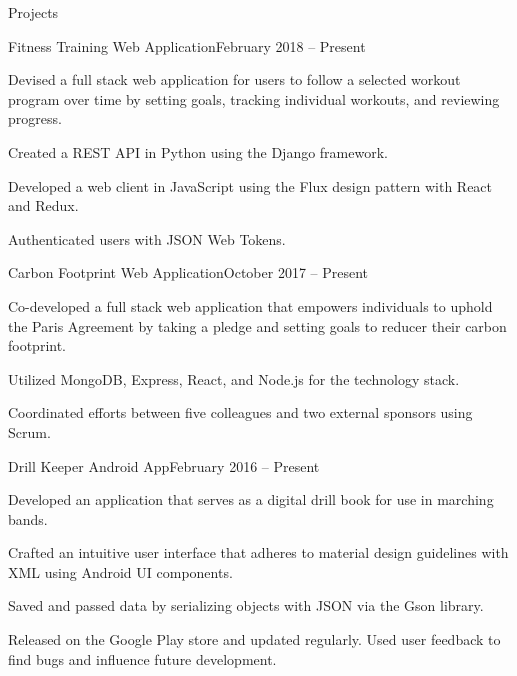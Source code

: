 \documentclass{resume} %
\begin{document}
\begin{rSection}{Projects}

\begin{rSubsection}{Fitness Training Web Application}{February 2018 -- Present}{}{}
\item Devised a full stack web application for users to follow a selected workout program over time by setting goals, tracking individual workouts, and reviewing progress.
\item Created a REST API in Python using the Django framework.
\item Developed a web client in JavaScript using the Flux design pattern with React and Redux.
\item Authenticated users with JSON Web Tokens.
\end{rSubsection}

\begin{rSubsection}{Carbon Footprint Web Application}{October 2017 -- Present}{}{}
\item Co-developed a full stack web application that empowers individuals to uphold the Paris Agreement by taking a pledge and setting goals to reducer their carbon footprint.
\item Utilized MongoDB, Express, React, and Node.js for the technology stack.
\item Coordinated efforts between five colleagues and two external sponsors using Scrum.
\end{rSubsection}

\begin{rSubsection}{Drill Keeper Android App}{February 2016 -- Present}{}{}
\item Developed an application that serves as a digital drill book for use in marching bands.
\item Crafted an intuitive user interface that adheres to material design guidelines with XML using Android UI components.
\item Saved and passed data by serializing objects with JSON via the Gson library.
\item Released on the Google Play store and updated regularly. Used user feedback to find bugs and influence future development.
\end{rSubsection}

\end{rSection}

\end{document}
